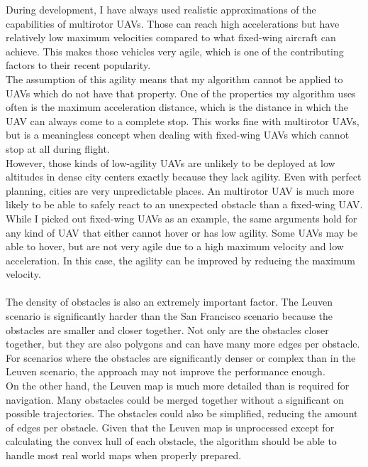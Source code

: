 During development, I have always used realistic approximations of the capabilities of multirotor UAVs. Those can reach high accelerations but have relatively low maximum velocities compared to what fixed-wing aircraft can achieve. This makes those vehicles very agile, which is one of the contributing factors to their recent popularity. \\
The assumption of this agility means that my algorithm cannot be applied to UAVs which do not have that property. One of the properties my algorithm uses often is the maximum acceleration distance, which is the distance in which the UAV can always come to a complete stop. This works fine with multirotor UAVs, but is a meaningless concept when dealing with fixed-wing UAVs which cannot stop at all during flight. \\
However, those kinds of low-agility UAVs are unlikely to be deployed at low altitudes in dense city centers exactly because they lack agility. Even with perfect planning, cities are very unpredictable places. An multirotor UAV is much more likely to be able to safely react to an unexpected obstacle than a fixed-wing UAV. \\
While I picked out fixed-wing UAVs as an example, the same arguments hold for any kind of UAV that either cannot hover or has low agility. Some UAVs may be able to hover, but are not very agile due to a high maximum velocity and low acceleration. In this case, the agility can be improved by reducing the maximum velocity.\\ \\

The density of obstacles is also an extremely important factor. The Leuven scenario is significantly harder than the San Francisco scenario because the obstacles are smaller and closer together. Not only are the obstacles closer together, but they are also polygons and can have many more edges per obstacle. For scenarios where the obstacles are significantly denser or complex than in the Leuven scenario, the approach may not improve the performance enough. \\
On the other hand, the Leuven map is much more detailed than is required for navigation. Many obstacles could be merged together without a significant on possible trajectories. The obstacles could also be simplified, reducing the amount of edges per obstacle. Given that the Leuven map is unprocessed except for calculating the convex hull of each obstacle, the algorithm should be able to handle most real world maps when properly prepared.

